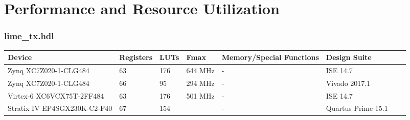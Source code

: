 \documentclass{article}
\def\comp{lime\_tx}
\begin{document}
\section*{Performance and Resource Utilization}
\subsubsection*{\comp.hdl}
\begin{scriptsize}
  \begin{tabular}{|M{4.5cm}|M{1cm}|M{1cm}|M{1.5cm}|M{2cm}|M{1cm}|M{1cm}|M{2.5cm}|}
    \hline
    Device                    		& Registers & LUTs & Fmax    & Memory/Special Functions & Design Suite \\
    \hline
    Zynq XC7Z020-1-CLG484     		& 63        & 176  & 644 MHz & -                        & ISE 14.7 \\
    \hline
    Zynq XC7Z020-1-CLG484     		& 66        & 95   & 294 MHz & -                        & Vivado 2017.1 \\
    \hline
    Virtex-6 XC6VCX75T-2FF484 		& 63        & 176  & 501 MHz & -                        & ISE 14.7     \\
    \hline
    Stratix IV EP4SGX230K-C2-F40 	& 67     	& 154  &         & -                        & Quartus Prime 15.1 \\
    \hline
  \end{tabular}
\end{scriptsize}
\end{document}
